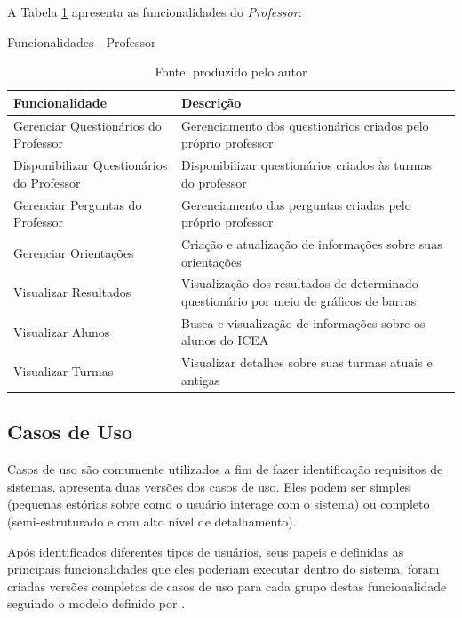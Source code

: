 \documentclass[
  12pt,       %
  openright,      %
  oneside,      %
  a4paper,      %
  english,      %
  french,        %
  spanish,     %
  brazil        %
  ]{abntex2-decsi}
\begin{document}
    A Tabela \ref{tab:funcoes-prof} apresenta as funcionalidades do \textit{Professor}: 

    \begin{table}[h]
    \centering
    \caption{Funcionalidades - Professor}
    \begin{tabular}{p{5cm} p{10cm}}
    \hline
    Funcionalidade & Descrição \\
    \hline
    \hline      
    Gerenciar Questionários do Professor & Gerenciamento dos questionários criados pelo próprio professor\\
    \hline
    Disponibilizar Questionários do Professor & Disponibilizar questionários criados às turmas do professor\\
    \hline
    Gerenciar Perguntas do Professor & Gerenciamento das perguntas criadas pelo próprio professor\\
    \hline
    Gerenciar Orientações & Criação e atualização de informações sobre suas orientações\\
    \hline
    Visualizar Resultados & Visualização dos resultados de determinado questionário por meio de gráficos de barras\\
    \hline
    Visualizar Alunos & Busca e visualização de informações sobre os alunos do ICEA\\
    \hline
    Visualizar Turmas & Visualizar detalhes sobre suas turmas atuais e antigas\\
    \hline            
    \end{tabular}
    \caption*{Fonte: produzido pelo autor}
    \label{tab:funcoes-prof}
    \end{table}
	
    \newpage 
    
    \subsection{Casos de Uso}

    Casos de uso são comumente utilizados a fim de fazer identificação requisitos de sistemas.  apresenta duas versões dos casos de uso. Eles podem ser simples (pequenas estórias sobre como o usuário interage com o sistema) ou completo (semi-estruturado e com alto nível de detalhamento).  

    Após identificados diferentes tipos de usuários, seus papeis e definidas as principais funcionalidades que eles poderiam executar dentro do sistema, foram criadas versões completas de casos de uso para cada grupo destas funcionalidade seguindo o modelo definido por . 
\end{document}

